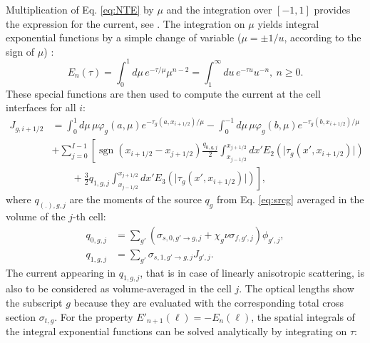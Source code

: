 \documentclass{ictt26}
\DeclareMathOperator{\sign}{sgn}
\providecommand{\DIFadd}[1]{{\protect\color{blue}\uwave{#1}}} %
\providecommand{\DIFdel}[1]{{\protect\color{red}\sout{#1}}}                      %
\providecommand{\DIFaddbegin}{} %
\providecommand{\DIFaddend}{} %
\providecommand{\DIFdelbegin}{} %
\providecommand{\DIFdelend}{} %
\newcommand{\DIFscaledelfig}{0.5}
\newlength{\DIFdelgraphicswidth} %
\newlength{\DIFdelgraphicsheight} %
\newcommand{\DIFaddincludegraphics}[2][]{{\color{blue}\fbox{\DIFOincludegraphics[#1]{#2}}}} %
\newcommand{\DIFdelincludegraphics}[2][]{%
\sbox{\DIFdelgraphicsbox}{\DIFOincludegraphics[#1]{#2}}%
\settoboxwidth{\DIFdelgraphicswidth}{\DIFdelgraphicsbox} %
\settoboxtotalheight{\DIFdelgraphicsheight}{\DIFdelgraphicsbox} %
\scalebox{\DIFscaledelfig}{%
\parbox[b]{\DIFdelgraphicswidth}{\usebox{\DIFdelgraphicsbox}\\[-\baselineskip] \rule{\DIFdelgraphicswidth}{0em}}\llap{\resizebox{\DIFdelgraphicswidth}{\DIFdelgraphicsheight}{%
\setlength{\unitlength}{\DIFdelgraphicswidth}%
\begin{picture}(1,1)%
\thicklines\linethickness{2pt} %
{\color[rgb]{1,0,0}\put(0,0){\framebox(1,1){}}}%
{\color[rgb]{1,0,0}\put(0,0){\line( 1,1){1}}}%
{\color[rgb]{1,0,0}\put(0,1){\line(1,-1){1}}}%
\end{picture}%
}\hspace*{3pt}}} %
} %
\DeclareRobustCommand{\DIFaddbegin}{\DIFOaddbegin \let\includegraphics\DIFaddincludegraphics} %
\DeclareRobustCommand{\DIFaddend}{\DIFOaddend \let\includegraphics\DIFOincludegraphics} %
\DeclareRobustCommand{\DIFdelbegin}{\DIFOdelbegin \let\includegraphics\DIFdelincludegraphics} %
\DeclareRobustCommand{\DIFdelend}{\DIFOaddend \let\includegraphics\DIFOincludegraphics} %
\begin{document}
Multiplication of Eq. \ref{eq:NTE} by $\mu$ and the integration over $[-1, 1]$ provides the expression for the current, see \cite{tomatis2011application}. The integration on $\mu$ yields integral exponential functions by a simple change of variable ($\mu = \pm 1/u$, according to the sign of $\mu$) \cite{AS1964handbook}:
\begin{equation*}
E_n(\tau) = \int_0^1{d\mu\, e^{-\tau / \mu} \mu^{n-2}} = \int_1^\infty{du\, e^{-\tau u}u^{-n}}, \: n \geq 0.
\end{equation*}
These special functions are then used to compute the current at the cell interfaces for all $i$:
\begin{equation}
\begin{split}
J_{g,i+1/2} &= \int_0^{ 1}{d\mu\, \mu \varphi_g(a, \mu) e^{-\tau_g(a, x_{i+1/2})/\mu}}
             - \int_0^{-1}{d\mu\, \mu \varphi_g(b, \mu) e^{-\tau_g(b, x_{i+1/2})/\mu}}\\
  & + \sum_{j=0}^{I-1} \left[  \sign(x_{i+1/2} - x_{j+1/2}) \frac{q_{0,g,j}}{2} \int_{x_{j-1/2}}^{x_{j+1/2}}{dx' E_{2}\left(\lvert \tau_g(x', x_{i+1/2}) \rvert \right) } \right.\\
  & \left. \qquad+ \frac{3}{2}q_{1,g,j} \int_{x_{j-1/2}}^{x_{j+1/2}}{dx' E_{3}\left(\lvert \tau_g(x', x_{i+1/2}) \rvert \right) }\right],
\end{split}
\label{eq:J_tr}
\end{equation}
where \DIFdelbegin \DIFdel{$q_{(.),g,j}$ }\DIFdelend \DIFaddbegin \DIFadd{$q_{(\cdot),g,j}$ }\DIFaddend are the moments of the source $q_g$ from Eq. \ref{eq:srcg} averaged in the volume of the $j$-th cell:
\begin{subequations}
\label{eq:srclg}
\begin{align}
   q_{0,g,j} &= \sum_{g'}\left(\sigma_{s,0,g' \rightarrow g,j} +
                              \chi_g \nu\sigma_{f,g',j}
                        \right) \phi_{g',j},\label{eq:srclg0}\\
   q_{1,g,j} &= \sum_{g'}\sigma_{s,1,g' \rightarrow g,j}J_{g',j}.\label{eq:srclg1}
\end{align}
\end{subequations}
The current appearing in $q_{1,g,j}$, that is in case of linearly anisotropic scattering, is also to be considered as volume-averaged in the cell $j$. The optical lengths \DIFaddbegin \DIFadd{$\tau$ in Eq. \ref{eq:J_tr} }\DIFaddend show the subscript $g$ because they are evaluated with the corresponding total cross section $\sigma_{t,g}$. For the property $E'_{n+1}(\ell) = -E_n(\ell)$, the spatial integrals of the integral exponential functions can be solved analytically by integrating on $\tau$:
\end{document}
